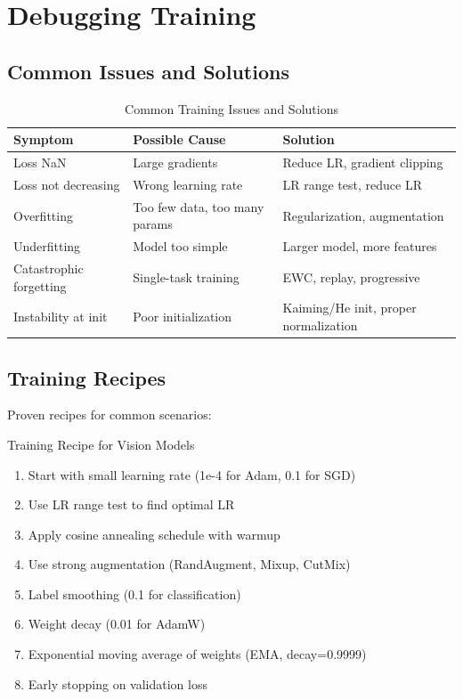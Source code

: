\section{Debugging Training}

\subsection{Common Issues and Solutions}

\begin{table}[ht]
    \centering
    \caption{Common Training Issues and Solutions}
    \begin{tabular}{L{3cm} L{4cm} L{4cm}}
        \toprule
        \textbf{Symptom} & \textbf{Possible Cause} & \textbf{Solution} \\
        \midrule
        Loss NaN & Large gradients & Reduce LR, gradient clipping \\
        Loss not decreasing & Wrong learning rate & LR range test, reduce LR \\
        Overfitting & Too few data, too many params & Regularization, augmentation \\
        Underfitting & Model too simple & Larger model, more features \\
        Catastrophic forgetting & Single-task training & EWC, replay, progressive \\
        Instability at init & Poor initialization & Kaiming/He init, proper normalization \\
        \bottomrule
    \end{tabular}
\end{table}

\subsection{Training Recipes}

Proven recipes for common scenarios:

\begin{algorithm}[H]
\caption{Training Recipe for Vision Models}
\begin{enumerate}
    \item Start with small learning rate (1e-4 for Adam, 0.1 for SGD)
    \item Use LR range test to find optimal LR
    \item Apply cosine annealing schedule with warmup
    \item Use strong augmentation (RandAugment, Mixup, CutMix)
    \item Label smoothing (0.1 for classification)
    \item Weight decay (0.01 for AdamW)
    \item Exponential moving average of weights (EMA, decay=0.9999)
    \item Early stopping on validation loss
\end{enumerate}
\end{algorithm}

